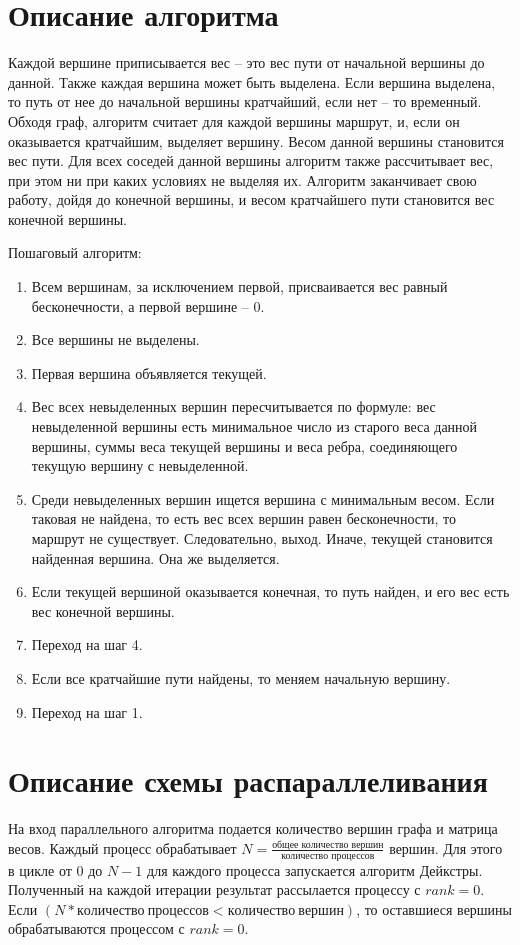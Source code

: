 \documentclass{report}
\begin{document}
\section*{Описание алгоритма}
\par Каждой вершине приписывается вес – это вес пути от начальной вершины до данной. Также каждая вершина может быть выделена. Если вершина выделена, то путь от нее до начальной вершины кратчайший, если нет – то временный. Обходя граф, алгоритм считает для каждой вершины маршрут, и, если он оказывается кратчайшим, выделяет вершину. Весом данной вершины становится вес пути. Для всех соседей данной вершины алгоритм также рассчитывает вес, при этом ни при каких условиях не выделяя их. Алгоритм заканчивает свою работу, дойдя до конечной вершины, и весом кратчайшего пути становится вес конечной вершины.
\par Пошаговый алгоритм:
\begin{enumerate}
\item Всем вершинам, за исключением первой, присваивается вес равный бесконечности, а первой вершине – 0.
\item Все вершины не выделены.
\item Первая вершина объявляется текущей.
\item Вес всех невыделенных вершин пересчитывается по формуле: вес невыделенной вершины есть минимальное число из старого веса данной вершины, суммы веса текущей вершины и веса ребра, соединяющего текущую вершину с невыделенной.
\item Среди невыделенных вершин ищется вершина с минимальным весом. Если таковая не найдена, то есть вес всех вершин равен бесконечности, то маршрут не существует. Следовательно, выход. Иначе, текущей становится найденная вершина. Она же выделяется.
\item Если текущей вершиной оказывается конечная, то путь найден, и его вес есть вес конечной вершины.
\item Переход на шаг 4.
\item Если все кратчайшие пути найдены, то меняем начальную вершину.
\item Переход на шаг 1.
\end{enumerate}

\newpage

\section*{Описание схемы распараллеливания}
\par На вход параллельного алгоритма подается количество вершин графа и матрица весов. Каждый процесс обрабатывает $N=\frac{\text{общее количество вершин}}{\text{количество процессов}}$ вершин. Для этого в цикле от $0$ до $N-1$ для каждого процесса запускается алгоритм Дейкстры. Полученный на каждой итерации результат рассылается процессу с $rank=0$. Если $(N*количество \ процессов<количество \ вершин)$, то оставшиеся вершины обрабатываются процессом с $rank=0$.
\end{document}
